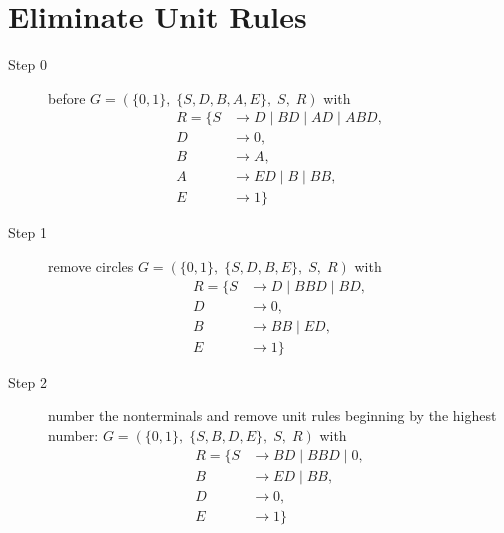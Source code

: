 \documentclass{article}
\begin{document}
\section{Eliminate Unit Rules}
\begin{description}
	\item[Step 0] before
	$G=\left(\{	0, 1\},\;\{ S, D, B, A, E\},\;S,\;R\right)$ with
	\begin{align*}
		R=\{	S &\rightarrow D\;|\;BD\;|\;AD\;|\;ABD, \\ 
		D &\rightarrow 0, \\ 
		B &\rightarrow A, \\ 
		A &\rightarrow ED\;|\;B\;|\;BB, \\ 
		E &\rightarrow 1\}
	\end{align*}
	\item[Step 1] remove circles
	$G=\left(\{	0, 1\},\;\{ S, D, B, E\},\;S,\;R\right)$ with
	\begin{align*}
		R=\{	S &\rightarrow D\;|\;BBD\;|\;BD, \\ 
		D &\rightarrow 0, \\ 
		B &\rightarrow BB\;|\;ED, \\ 
		E &\rightarrow 1\}
	\end{align*}
	\item[Step 2] number the nonterminals and remove unit rules beginning by the highest number:
	$G=\left(\{	0, 1\},\;\{ S, B, D, E\},\;S,\;R\right)$ with
	\begin{align*}
		R=\{	S &\rightarrow BD\;|\;BBD\;|\;0, \\ 
		B &\rightarrow ED\;|\;BB, \\ 
		D &\rightarrow 0, \\ 
		E &\rightarrow 1\}
	\end{align*}
\end{description}
\end{document}
